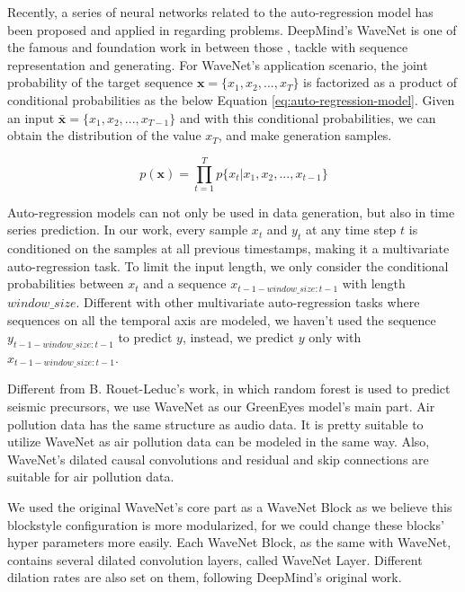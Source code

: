 \documentclass[sigconf]{acmart}
\begin{document}
Recently, a series of neural networks related to the auto-regression model has been proposed and applied in regarding problems. DeepMind's WaveNet \cite{oord2016wavenet} is one of the famous and foundation work in between those \cite{shen2018natural}, \cite{wang2017tacotron} tackle with sequence representation and generating. For WaveNet's application scenario, the joint probability of the target sequence $\textbf{x}=\{x_1,x_2,...,x_T\}$ is factorized as a product of conditional probabilities as the below Equation \ref{eq:auto-regression-model}. Given an input $\bar{\textbf{x}}=\{x_1,x_2,...,x_{T-1}\}$ and with this conditional probabilities, we can obtain the distribution of the value $x_T$, and make generation samples.

\begin{equation}
    p(\textbf{x})=\prod_{t=1}^Tp\{x_t|x_1,x_2,...,x_{t-1}\}
    \label{eq:auto-regression-model}
\end{equation}

Auto-regression models can not only be used in data generation, but also in time series prediction. In our work, every sample $x_t$ and $y_t$ at any time step $t$ is conditioned on the samples at all previous timestamps, making it a multivariate auto-regression task. To limit the input length,  we only consider the conditional probabilities between $x_t$ and a sequence $x_{t-1-window\_size:t-1}$ with length $window\_size$. Different with other multivariate auto-regression tasks where sequences on all the temporal axis are modeled, we haven't used the sequence $y_{t-1-window\_size:t-1}$ to predict $y$, instead, we predict $y$ only with $x_{t-1-window\_size:t-1}$.

Different from B. Rouet-Leduc's work\cite{rouet2017machine}, in which random forest is used to predict seismic precursors, we use WaveNet as our GreenEyes model's main part. Air pollution data has the same structure as audio data. It is pretty suitable to utilize WaveNet as air pollution data can be modeled in the same way. Also, WaveNet's dilated causal convolutions and residual and skip connections are suitable for air pollution data.

We used the original WaveNet's core part as a WaveNet Block as we believe this block\-style configuration is more modularized, for we could change these blocks' hyper parameters more easily. Each WaveNet Block, as the same with WaveNet, contains several dilated convolution layers, called WaveNet Layer. Different dilation rates are also set on them, following DeepMind's original work. 
\end{document}
